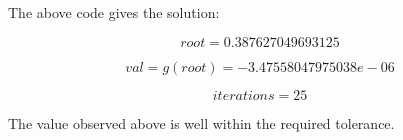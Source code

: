 \documentclass[a4paper]{article}
\begin{document}
The above code gives the solution:

\begin{equation}
root = 0.387627049693125
\end{equation}


\begin{equation}
val = g(root) = -3.47558047975038e-06
\end{equation}

\begin{equation}
iterations = 25
\end{equation}

The value observed above is well within the required tolerance. 
\end{document}
